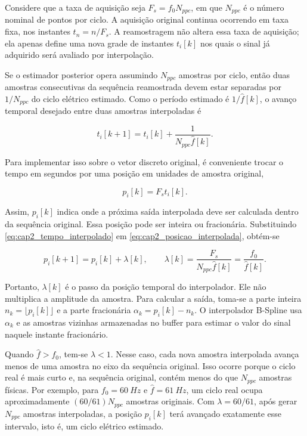 Considere que a taxa de aquisição seja $F_s=f_0N_{ppc}$, em que $N_{ppc}$ é o número nominal de pontos por ciclo. A aquisição original continua ocorrendo em taxa fixa, nos instantes $t_n=n/F_s$. A reamostragem não altera essa taxa de aquisição; ela apenas define uma nova grade de instantes $t_i[k]$ nos quais o sinal já adquirido será avaliado por interpolação.

Se o estimador posterior opera assumindo $N_{ppc}$ amostras por ciclo, então duas amostras consecutivas da sequência reamostrada devem estar separadas por $1/N_{ppc}$ do ciclo elétrico estimado. Como o período estimado é $1/\hat{f}[k]$, o avanço temporal desejado entre duas amostras interpoladas é

\begin{equation}
t_i[k+1] = t_i[k] + \frac{1}{N_{ppc}\hat{f}[k]}.
\label{eq:cap2_tempo_interpolado}
\end{equation}

\noindent Para implementar isso sobre o vetor discreto original, é conveniente trocar o tempo em segundos por uma posição em unidades de amostra original,

\begin{equation}
p_i[k] = F_s t_i[k].
\label{eq:cap2_posicao_interpolada}
\end{equation}

\noindent Assim, $p_i[k]$ indica onde a próxima saída interpolada deve ser calculada dentro da sequência original. Essa posição pode ser inteira ou fracionária. Substituindo \autoref{eq:cap2_tempo_interpolado} em \autoref{eq:cap2_posicao_interpolada}, obtém-se

\begin{equation}
p_i[k+1] = p_i[k] + \lambda[k],
\qquad
\lambda[k] = \frac{F_s}{N_{ppc}\hat{f}[k]} = \frac{f_0}{\hat{f}[k]}.
\label{eq:cap2_lambda}
\end{equation}

\noindent Portanto, $\lambda[k]$ é o passo da posição temporal do interpolador. Ele não multiplica a amplitude da amostra. Para calcular a saída, toma-se a parte inteira $n_k=\lfloor p_i[k]\rfloor$ e a parte fracionária $\alpha_k=p_i[k]-n_k$. O interpolador B-Spline usa $\alpha_k$ e as amostras vizinhas armazenadas no buffer para estimar o valor do sinal naquele instante fracionário.

Quando $\hat{f}>f_0$, tem-se $\lambda<1$. Nesse caso, cada nova amostra interpolada avança menos de uma amostra no eixo da sequência original. Isso ocorre porque o ciclo real é mais curto e, na sequência original, contém menos do que $N_{ppc}$ amostras físicas. Por exemplo, para $f_0=\SI{60}{Hz}$ e $\hat{f}=\SI{61}{Hz}$, um ciclo real ocupa aproximadamente $(60/61)N_{ppc}$ amostras originais. Com $\lambda=60/61$, após gerar $N_{ppc}$ amostras interpoladas, a posição $p_i[k]$ terá avançado exatamente esse intervalo, isto é, um ciclo elétrico estimado.

